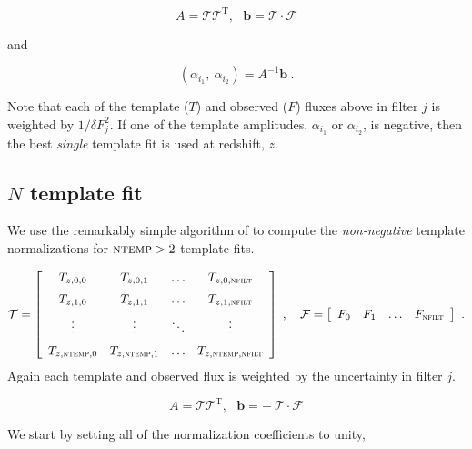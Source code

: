 \documentclass[11pt]{article}
\begin{document}
\begin{equation}
A = \mathcal{T}\mathcal{T}^\mathrm{T},\ \ \ 
\mathbf{b} = \mathcal{T}\cdot\mathcal{F}
\end{equation}

\noindent and 

\begin{equation}
\left(\alpha_{i_1},\ \alpha_{i_2}\right) = A^{-1}\mathbf{b}\ .
\end{equation}

Note that each of the template ($T$) and observed ($F$) fluxes above in filter
$j$ is weighted by $1/\delta F_j^2$. If one of the template amplitudes,
$\alpha_{i_1}$ or $\alpha_{i_2}$, is negative, then the best \textit{single}
template fit is used at redshift, $z$.

\subsection{$N$ template fit}

We use the remarkably simple algorithm of \cite{nmf} to compute the
\textit{non-negative} template normalizations for $\textsc{ntemp}>2$ template
fits.

\begin{equation}
\mathcal{T} = \left[
\begin {array}{cccc}
T_{z,0,0}& T_{z,0,1} & \ldots & T_{z,0,\textsc{nfilt}} \\
\noalign{\medskip}
T_{z,1,0}& T_{z,1,1} & \ldots & T_{z,1,\textsc{nfilt}} \\
\noalign{\medskip}
\vdots & \vdots & \ddots & \vdots \\
\noalign{\medskip}
T_{z,\textsc{ntemp},0}& T_{z,\textsc{ntemp},1} & \ldots & T_{z,\textsc{ntemp},\textsc{nfilt}} \\
\end {array}
\right]
\;,\ \ \  \mathcal{F} = \left[
\begin {array}{cccc}
F_0 & F_1 & \ldots & F_\textsc{nfilt} \\
\end {array}
\right]\ .
\end{equation}
Again each template and observed flux is weighted by the uncertainty in filter $j$.  

\begin{equation}
A = \mathcal{T}\mathcal{T}^\mathrm{T},\ \ \ 
\mathbf{b} = -\ \mathcal{T}\cdot\mathcal{F}
\end{equation}

We start by setting all of the normalization coefficients to unity, 
\end{document}
